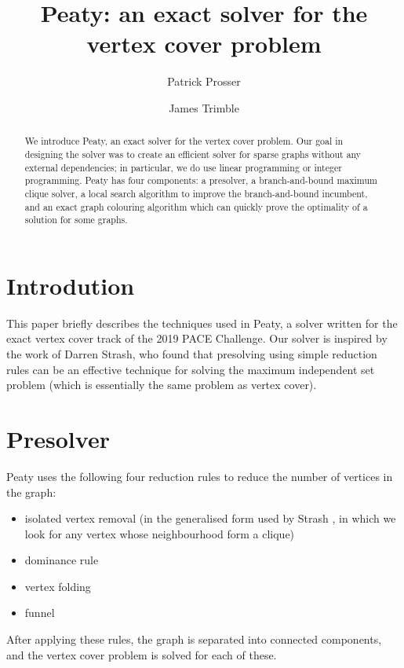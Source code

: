 \documentclass[a4paper,UKenglish,cleveref, autoref]{lipics-v2019}
\title{Peaty: an exact solver for the vertex cover problem}
\author{Patrick Prosser}{University of Glasgow, Scotland}{patrick.prosser@glasgow.ac.uk}{https://orcid.org/0000-0003-4460-6912}{}
\author{James Trimble}{University of Glasgow, Scotland}{j.trimble.1@research.gla.ac.uk}{https://orcid.org/0000-0001-7282-8745}{}
\begin{document}
\maketitle

\begin{abstract}
We introduce Peaty, an exact solver for the vertex cover problem.  Our goal in designing the solver was to create an efficient solver for sparse graphs without any external dependencies; in particular, we do use linear programming or integer programming.  Peaty has four components: a presolver, a branch-and-bound maximum clique solver, a local search algorithm to improve the branch-and-bound incumbent, and an exact graph colouring algorithm which can quickly prove the optimality of a solution for some graphs.
\end{abstract}

\section{Introdution}

This paper briefly describes the techniques used in Peaty, a solver written for the exact vertex cover track of the 2019 PACE Challenge.  Our solver is inspired by the work of Darren Strash, who found that presolving using simple reduction rules \cite{DBLP:conf/cocoon/Strash16} can be an effective technique for solving the maximum independent set problem (which is essentially the same problem as vertex cover).

\section{Presolver}

Peaty uses the following four reduction rules to reduce the number of vertices in the graph:
\begin{itemize}
  \item isolated vertex removal (in the generalised form used by Strash \cite{DBLP:conf/cocoon/Strash16}, in which we look for any vertex whose neighbourhood form a clique)
  \item dominance rule \cite{DBLP:journals/jacm/FominGK09}
  \item vertex folding \cite{DBLP:journals/jal/ChenKJ01}
  \item funnel \cite{DBLP:journals/tcs/XiaoN13}
\end{itemize}

After applying these rules, the graph is separated into connected components, and the vertex cover problem is solved for each of these.
\end{document}
